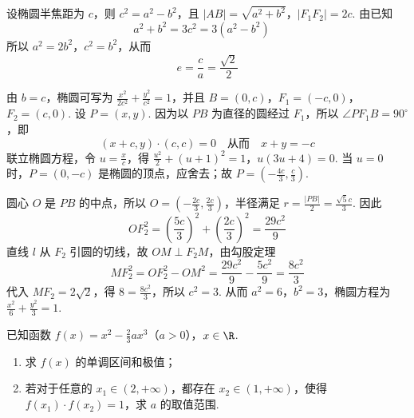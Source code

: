 \begin{solution}
设椭圆半焦距为 \(c\)，则 \(c^2=a^2-b^2\)，且 \(|AB|=\sqrt{a^2+b^2}\)，\(|F_1F_2|=2c\). 由已知
\[
a^2+b^2=3c^2=3(a^2-b^2)\quad
\]
所以 \(a^2=2b^2\)，\(c^2=b^2\)，从而
\[
e=\frac ca=\frac{\sqrt2}{2}
\]

由 \(b=c\)，椭圆可写为 \(\frac{x^2}{2c^2}+\frac{y^2}{c^2}=1\)，并且 \(B=(0,c)\)，\(F_1=(-c,0)\)，\(F_2=(c,0)\). 设 \(P=(x,y)\). 因为以 \(PB\) 为直径的圆经过 \(F_1\)，所以 \(\angle PF_1B=90^{\circ}\)，即
\[
(x+c,y)\cdot(c,c)=0\quad\text{从而}\quad x+y=-c
\]
联立椭圆方程，令 \(u=\frac xc\)，得
\(\frac{u^2}{2}+(u+1)^2=1\)，\(u(3u+4)=0\).
当 \(u=0\) 时，\(P=(0,-c)\) 是椭圆的顶点，应舍去；故 \(P=\left(-\frac{4c}{3},\frac c3\right)\).

圆心 \(O\) 是 \(PB\) 的中点，所以 \(O=\left(-\frac{2c}{3},\frac{2c}{3}\right)\)，半径满足 \(r=\frac{|PB|}{2}=\frac{\sqrt5c}{3}\). 因此
\[
OF_2^2=\left(\frac{5c}{3}\right)^2+\left(\frac{2c}{3}\right)^2=\frac{29c^2}{9}
\]
直线 \(l\) 从 \(F_2\) 引圆的切线，故 \(OM\perp F_2M\)，由勾股定理
\[
MF_2^2=OF_2^2-OM^2=\frac{29c^2}{9}-\frac{5c^2}{9}=\frac{8c^2}{3}
\]
代入 \(MF_2=2\sqrt2\)，得 \(8=\frac{8c^2}{3}\)，所以 \(c^2=3\). 从而 \(a^2=6\)，\(b^2=3\)，椭圆方程为 \(\frac{x^2}{6}+\frac{y^2}{3}=1\).
\end{solution}

\begin{problem}
已知函数 \( f(x) = x^2 - \frac{2}{3} a x^3 \)（\(a > 0\)），\(x \in \R\).

\begin{enumerate}
\item 求 \( f(x) \) 的单调区间和极值；
\item 若对于任意的 \(x_{1} \in (2, +\infty)\)，都存在 \(x_{2} \in (1, +\infty)\)，使得 \(f(x_{1}) \cdot f(x_{2}) = 1\)，求 \(a\) 的取值范围.
\end{enumerate}
\end{problem}

